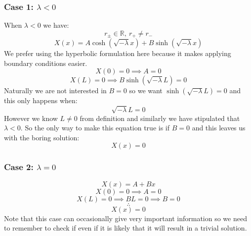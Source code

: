\documentclass[12pt]{article}
\begin{document}
\subsubsection{Case 1: \(\lambda<0\)}
When \(\lambda<0\) we have:
\[r_{\pm}\in\mathbb{R},\ r_+\ne r_-\]
\[X(x)=A\cosh(\sqrt{-\lambda}x)+B\sinh(\sqrt{-\lambda}x)\]
We prefer using the hyperbolic formulation here because it makes applying boundary conditions easier.
\[X(0)=0\implies A=0\]
\[X(L)=0\implies B\sinh(\sqrt{-\lambda}L)=0\]
Naturally we are not interested in \(B=0\) so we want \(\sinh(\sqrt{-\lambda}L)=0\) and this only happens when:
\[\sqrt{-\lambda}L=0\]
However we know \(L\ne 0\) from definition and similarly we have stipulated that \(\lambda<0\). So the only way to make this equation true is if \(B=0\) and this leaves us with the boring solution:
\[X(x)=0\]
\subsubsection{Case 2: \(\lambda=0\)}
\[X(x)=A+Bx\]
\[X(0)=0\implies A=0\]
\[X(L)=0\implies BL=0\implies B=0\]
\[\therefore\]
\[X(x)=0\]
Note that this case can occasionally give very important information so we need to remember to check if even if it is likely that it will result in a trivial solution.
\end{document}
